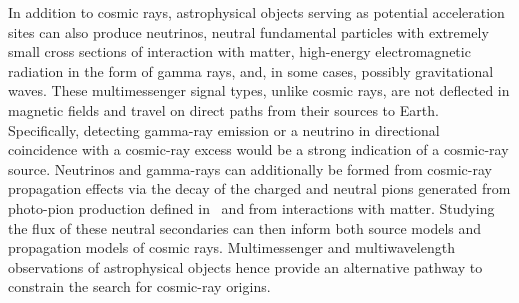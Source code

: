 In addition to cosmic rays, astrophysical objects serving as potential acceleration sites can also produce neutrinos, neutral fundamental particles with extremely small cross sections of interaction with matter, high-energy electromagnetic radiation in the form of gamma rays, and, in some cases, possibly gravitational waves.
These multimessenger signal types, unlike cosmic rays, are not deflected in magnetic fields and travel on direct paths from their sources to Earth.
Specifically, detecting gamma-ray emission or a neutrino in directional coincidence with a cosmic-ray excess would be a strong indication of a cosmic-ray source.
Neutrinos and gamma-rays can additionally be formed from cosmic-ray propagation effects via the decay of the charged and neutral pions generated from photo-pion production defined in~ and from interactions with matter.
Studying the flux of these neutral secondaries can then inform both source models and propagation models of cosmic rays.
Multimessenger and multiwavelength observations of astrophysical objects hence provide an alternative pathway to constrain the search for cosmic-ray origins.











